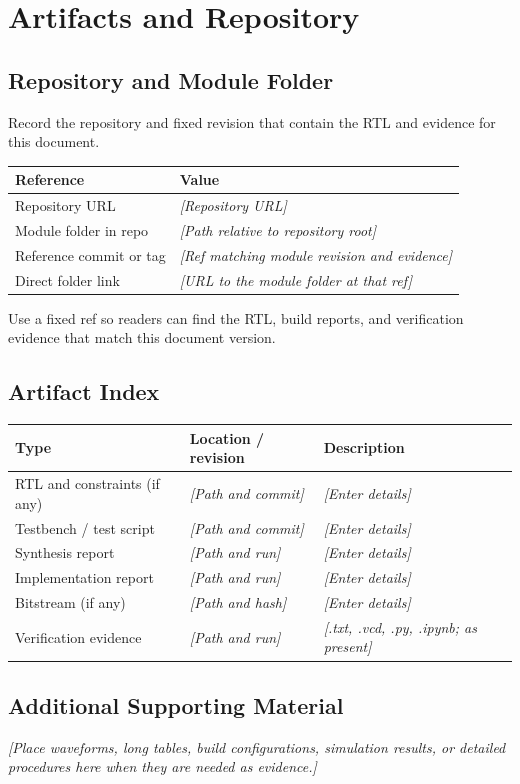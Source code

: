 \chapter{Artifacts and Repository}

\section{Repository and Module Folder}
Record the repository and fixed revision that contain the RTL and evidence for this document.

\begin{tabularx}{\textwidth}{@{}p{50mm}X@{}}
  \toprule
  Reference & Value \\
  \midrule
  Repository URL & \textit{[Repository URL]} \\
  Module folder in repo & \textit{[Path relative to repository root]} \\
  Reference commit or tag & \textit{[Ref matching module revision and evidence]} \\
  Direct folder link & \textit{[URL to the module folder at that ref]} \\
  \bottomrule
\end{tabularx}

Use a fixed ref so readers can find the RTL, build reports, and verification evidence that match this document version.

\section{Artifact Index}
\begin{tabularx}{\textwidth}{@{}p{50mm}X X@{}}
  \toprule
  Type & Location / revision & Description \\
  \midrule
  RTL and constraints (if any) & \textit{[Path and commit]} & \textit{[Enter details]} \\
  Testbench / test script & \textit{[Path and commit]} & \textit{[Enter details]} \\
  Synthesis report & \textit{[Path and run]} & \textit{[Enter details]} \\
  Implementation report & \textit{[Path and run]} & \textit{[Enter details]} \\
  Bitstream (if any) & \textit{[Path and hash]} & \textit{[Enter details]} \\
  Verification evidence & \textit{[Path and run]} & \textit{[.txt, .vcd, .py, .ipynb; as present]} \\
  \bottomrule
\end{tabularx}

\section{Additional Supporting Material}
\textit{[Place waveforms, long tables, build configurations, simulation results, or detailed procedures here when they are needed as evidence.]}
